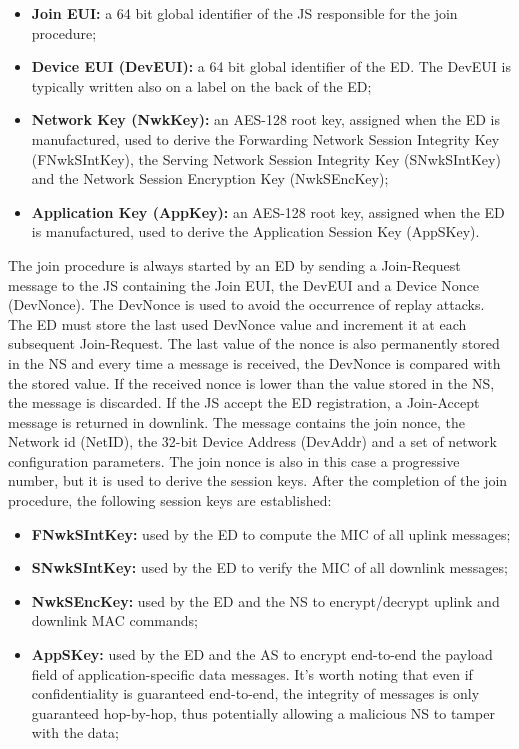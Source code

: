 \begin{itemize}
	\item \textbf{Join EUI:} a 64 bit global identifier of the \gls{JS} responsible for the join procedure;
	\item \textbf{Device EUI (DevEUI):} a 64 bit global identifier of the \gls{ED}. The DevEUI is typically written also on a label on the back of the \gls{ED};
	\item \textbf{Network Key (NwkKey):} an AES-128 root key, assigned when the \gls{ED} is manufactured, used to derive the Forwarding Network Session Integrity Key (FNwkSIntKey), the Serving Network Session Integrity Key (SNwkSIntKey) and the Network Session Encryption Key (NwkSEncKey);
	\item \textbf{Application Key (AppKey):} an AES-128 root key, assigned when the \gls{ED} is manufactured, used to derive the Application Session Key (AppSKey).
\end{itemize}

The join procedure is always started by an \gls{ED} by sending a Join-Request message to the \gls{JS} containing the Join EUI, the DevEUI and a Device Nonce (DevNonce). The DevNonce is used to avoid the occurrence of replay attacks. The \gls{ED} must store the last used DevNonce value and increment it at each subsequent Join-Request. The last value of the nonce is also permanently stored in the \gls{NS} and every time a message is received, the DevNonce is compared with the stored value. If the received nonce is lower than the value stored in the \gls{NS}, the message is discarded. If the \gls{JS} accept the \gls{ED} registration, a Join-Accept message is returned in downlink. The message contains the join nonce, the Network id (NetID), the 32-bit Device Address (DevAddr) and a set of network configuration parameters. The join nonce is also in this case a progressive number, but it is used to derive the session keys. After the completion of the join procedure, the following session keys are established:

\begin{itemize}

\item \textbf{FNwkSIntKey:} used by the \gls{ED} to compute the \gls{MIC} of all uplink messages;
\item \textbf{SNwkSIntKey:} used by the \gls{ED} to verify the \gls{MIC} of all downlink messages;
\item \textbf{NwkSEncKey:} used by the \gls{ED} and the \gls{NS} to encrypt/decrypt uplink and downlink MAC commands;
\item \textbf{AppSKey:} used by the \gls{ED} and the \gls{AS} to encrypt end-to-end the payload field of application-specific data messages. It's worth noting that even if confidentiality is guaranteed end-to-end, the integrity of messages is only guaranteed hop-by-hop, thus potentially allowing a malicious \gls{NS} to tamper with the data;

\end{itemize}

